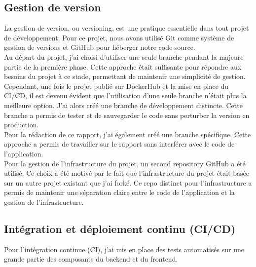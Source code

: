\subsection{Gestion de version}\label{subsec:gestion-de-version}

La gestion de version, ou versioning, est une pratique essentielle dans tout projet de développement.
Pour ce projet, nous avons utilisé Git comme système de gestion de versions et GitHub pour héberger notre code source.\\

Au départ du projet, j'ai choisi d'utiliser une seule branche pendant la majeure partie de la première phase.
Cette approche était suffisante pour répondre aux besoins du projet à ce stade, permettant de maintenir une simplicité de gestion.\\

Cependant, une fois le projet publié sur DockerHub et la mise en place du CI/CD, il est devenu évident que l'utilisation d'une seule branche n'était plus la meilleure option.
J'ai alors créé une branche de développement distincte.
Cette branche a permis de tester et de sauvegarder le code sans perturber la version en production.\\

Pour la rédaction de ce rapport, j'ai également créé une branche spécifique.
Cette approche a permis de travailler sur le rapport sans interférer avec le code de l'application.\\

Pour la gestion de l'infrastructure du projet, un second repository GitHub a été utilisé.
Ce choix a été motivé par le fait que l'infrastructure du projet était basée sur un autre projet existant que j'ai forké.
Ce repo distinct pour l'infrastructure a permis de maintenir une séparation claire entre le code de l'application et la gestion de l'infrastructure.\\

\subsection{Intégration et déploiement continu (CI/CD)}\label{subsec:integration-et-deploiement-continu-(ci/cd)}

Pour l'intégration continue (CI), j'ai mis en place des tests automatisés sur une grande partie des composants du backend et du frontend.

